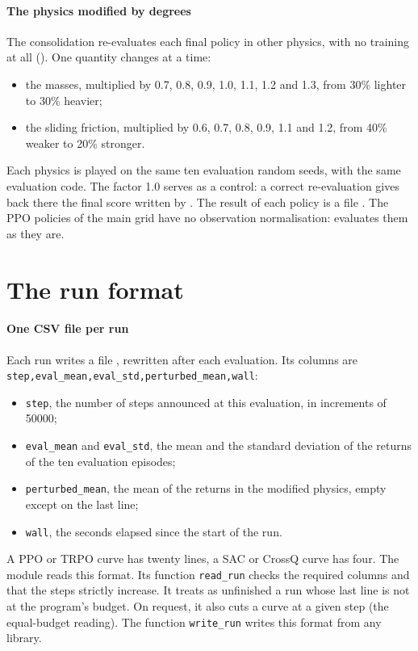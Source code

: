 \paragraph{The physics modified by degrees}
The consolidation re-evaluates each final policy in other physics, with no training at all
(). One quantity changes at a time:
\begin{itemize}
  \item the masses, multiplied by 0.7, 0.8, 0.9, 1.0, 1.1, 1.2 and 1.3, from 30\% lighter to 30\% heavier;
  \item the sliding friction, multiplied by 0.6, 0.7, 0.8, 0.9, 1.1 and 1.2, from 40\% weaker to 20\%
    stronger.
\end{itemize}
Each physics is played on the same ten evaluation random seeds, with the same evaluation code. The factor 1.0
serves as a control: a correct re-evaluation gives back there the final score written by . The
result of each policy is a file
\allowbreak{}\allowbreak{}\allowbreak{}.
The PPO policies of the main grid have no observation normalisation:  evaluates them as
they are.

\section{The run format}\label{sec:format}

\paragraph{One CSV file per run}
Each run writes a file
\allowbreak{}\allowbreak{}\allowbreak{}, rewritten
after each evaluation. Its columns are
\texttt{step,}\allowbreak\texttt{eval\_mean,}\allowbreak\texttt{eval\_std,}\allowbreak\texttt{perturbed\_mean,}\allowbreak\texttt{wall}:
\begin{itemize}
  \item \texttt{step}, the number of steps announced at this evaluation, in increments of \num{50000};
  \item \texttt{eval\_mean} and \texttt{eval\_std}, the mean and the standard deviation of the returns of the
    ten evaluation episodes;
  \item \texttt{perturbed\_mean}, the mean of the returns in the modified physics, empty except on the last
    line;
  \item \texttt{wall}, the seconds elapsed since the start of the run.
\end{itemize}
A PPO or TRPO curve has twenty lines, a SAC or CrossQ curve has four. The module
 reads this format. Its function \texttt{read\_run} checks the required columns
and that the steps strictly increase. It treats as unfinished a run whose last line is not at the program's
budget. On request, it also cuts a curve at a given step (the equal-budget reading). The function
\texttt{write\_run} writes this format from any library.

